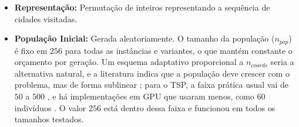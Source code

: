 \begin{itemize}
  \tightlist
  \item
        \textbf{Representação:} Permutação de inteiros representando a sequência de cidades visitadas.
  \item
        \textbf{População Inicial:} Gerada aleatoriamente. O tamanho da população (\(n_{pop}\)) é fixo em \(256\) para todas as instâncias e variantes, o que mantém constante o orçamento por geração.
        Um esquema adaptativo proporcional a \(n_{coords}\) seria a alternativa natural, e a literatura indica que a população deve crescer com o problema, mas de forma sublinear \autocite{harik1999gambler,goldberg1992massive}; para o TSP, a faixa prática usual vai de \(50\) a \(500\) \autocite{larranaga1999genetic}, e há implementações em GPU que usaram menos, como \(60\) indivíduos \autocite{fujimoto2011highly}.
        O valor \(256\) está dentro dessa faixa e funcionou em todos os tamanhos testados.


\end{itemize}
